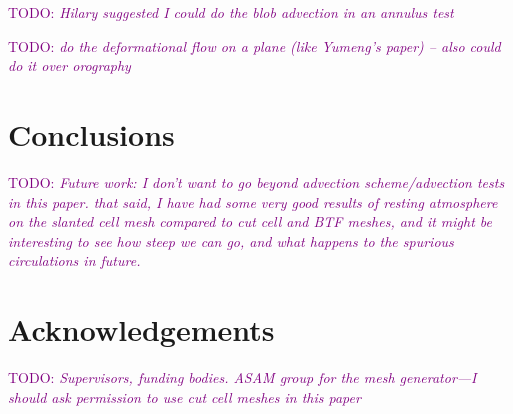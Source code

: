 \documentclass{article}
\newcommand{\TODO}[1]{\textcolor{purple}{TODO: \emph{#1}}}
\begin{document}
\TODO{Hilary suggested I could do the blob advection in an annulus test \citep{berger-helzel2012}}

\TODO{do the deformational flow on a plane (like Yumeng's paper) -- also could do it over orography}


\section{Conclusions}

\TODO{Future work: I don't want to go beyond advection scheme/advection tests in this paper.  that said, I have had some very good results of resting atmosphere on the slanted cell mesh compared to cut cell and BTF meshes, and it might be interesting to see how steep we can go, and what happens to the spurious circulations in future.}

\section{Acknowledgements}
\TODO{Supervisors, funding bodies.  ASAM group for the mesh generator---I should ask permission to use cut cell meshes in this paper}



\end{document}

